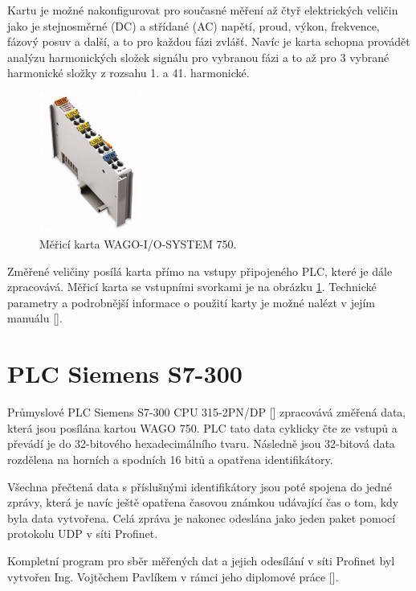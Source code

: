Kartu je možné nakonfigurovat pro současné měření až čtyř elektrických veličin jako je stejnosměrné (DC) a střídané (AC) napětí, proud, výkon, frekvence, fázový posuv a další, a to pro každou fázi zvlášť. Navíc je karta schopna provádět analýzu harmonických složek signálu pro vybranou fázi a to až pro 3 vybrané harmonické složky z rozsahu 1. a 41. harmonické. 

\begin{figure}[ht]
    \includegraphics[width=0.3\textwidth]{wago_obr}
    \caption{Měřicí karta WAGO-I/O-SYSTEM 750.}
    \label{wago_pic}
\end{figure}

Změřené veličiny posílá karta přímo na vstupy připojeného PLC, které je dále zpracovává. Měřicí karta se vstupními svorkami je na obrázku \ref{wago_pic}. Technické parametry a podrobnější informace o použití karty je možné nalézt v jejím manuálu [\cite{wago}].

\section{PLC Siemens S7-300}

Průmyslové PLC Siemens S7-300 CPU 315-2PN/DP [\cite{siemens_plc}] zpracovává změřená data, která jsou posílána kartou WAGO 750. PLC tato data cyklicky čte ze vstupů a převádí je do 32-bitového hexadecimálního tvaru. Následně jsou 32-bitová data rozdělena na horních a spodních 16 bitů a opatřena identifikátory. 

Všechna přečtená data s příslušnými identifikátory jsou poté spojena do jedné zprávy, která je navíc ještě opatřena časovou známkou udávající čas o tom, kdy byla data vytvořena. Celá zpráva je nakonec odeslána jako jeden paket pomocí protokolu UDP v síti Profinet.  

Kompletní program pro sběr měřených dat a jejich odesílání v síti Profinet byl vytvořen Ing. Vojtěchem Pavlíkem v rámci jeho diplomové práce [\cite{vojtech_pavlik}]. 


